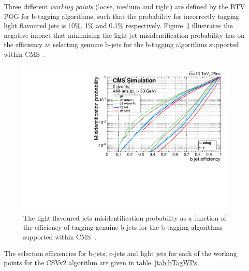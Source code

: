 Three different \emph{working points} (loose, medium and tight) are defined by the BTV POG for b-tagging algorithms, such that the probability for incorrectly tagging light flavoured jets is 10\%, 1\% and 0.1\% respectively.
Figure~\ref{fig:bTagEffVsMisId} illustrates the negative impact that minimising the light jet misidentification probability has on the efficiency at selecting genuine b-jets for the b-tagging algorithms supported within CMS~\cite{Sirunyan:2017ezt}.

\begin{figure}[tbp]
\centering
\includegraphics[width=\textwidth]{figs/data-mc/effVsMisTagcsvV2.pdf}
\caption{The light flavoured jets misidentification probability as a function of the efficiency of tagging genuine b-jets for the b-tagging algorithms supported within CMS~\cite{Sirunyan:2017ezt}.}
\label{fig:bTagEffVsMisId}
\end{figure}

The selection efficiencies for b-jets, c-jets and light jets for each of the working points for the CSVv2 algorithm are given in table~\ref{tab:bTagWPs}.

